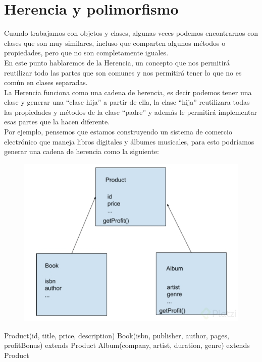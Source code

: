 \documentclass{article}
\begin{document}
\newpage

\section{Herencia y polimorfismo}%
Cuando trabajamos con objetos y clases, algunas veces podemos encontrarnos con
clases que son muy similares, incluso que comparten algunos métodos o
propiedades, pero que no son completamente iguales.\\

En este punto hablaremos de la Herencia, un concepto que nos permitirá
reutilizar todo las partes que son comunes y nos permitirá tener lo que no es
común en clases separadas.\\

La Herencia funciona como una cadena de herencia, es decir podemos tener una
clase y generar una “clase hija” a partir de ella, la clase “hija” reutilizara
todas las propiedades y métodos de la clase “padre” y además le permitirá
implementar esas partes que la hacen diferente.\\

Por ejemplo, pensemos que estamos construyendo un sistema de comercio
electrónico que maneja libros digitales y álbumes musicales, para esto
podríamos generar una cadena de herencia como la siguiente:\\

\begin{figure}[h!]
  \centering
  \includegraphics[scale=0.5]{./Pictures/029_herencia.jpg}
\end{figure}

Product(id, title, price, description)
Book(isbn, publisher, author, pages, profitBonus) extends Product
Album(company, artist, duration, genre) extends Product\\
\end{document}
